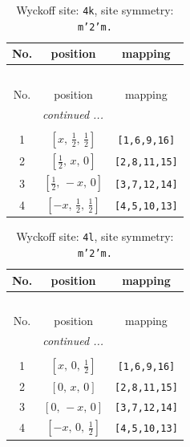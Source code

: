 \documentclass[fleqn,8pt]{jsarticle}
\begin{document}
\renewcommand{\arraystretch}{1.2}
\begin{longtable}{ccc}
\caption{Wyckoff site: {\tt 4k}, site symmetry: {\tt m'2'm.}}
 \\
 \hline \hline
No. & position & mapping \\ \hline \endfirsthead

\multicolumn{2}{l}{\tablename\ \thetable{}} \\
 \hline \hline
No. & position & mapping \\ \hline \endhead

 \hline \hline
\multicolumn{2}{r}{\footnotesize\it continued ...} \\ \endfoot

 \hline \hline
\multicolumn{2}{r}{} \\ \endlastfoot

1 & $\left[ x,\, \frac{1}{2},\, \frac{1}{2} \right]$ & {\tt [1,6,9,16]} \\ \hline
2 & $\left[ \frac{1}{2},\, x,\, 0 \right]$ & {\tt [2,8,11,15]} \\ \hline
3 & $\left[ \frac{1}{2},\, - x,\, 0 \right]$ & {\tt [3,7,12,14]} \\ \hline
4 & $\left[ - x,\, \frac{1}{2},\, \frac{1}{2} \right]$ & {\tt [4,5,10,13]} \\
\end{longtable}
\renewcommand{\arraystretch}{1.2}
\begin{longtable}{ccc}
\caption{Wyckoff site: {\tt 4l}, site symmetry: {\tt m'2'm.}}
 \\
 \hline \hline
No. & position & mapping \\ \hline \endfirsthead

\multicolumn{2}{l}{\tablename\ \thetable{}} \\
 \hline \hline
No. & position & mapping \\ \hline \endhead

 \hline \hline
\multicolumn{2}{r}{\footnotesize\it continued ...} \\ \endfoot

 \hline \hline
\multicolumn{2}{r}{} \\ \endlastfoot

1 & $\left[ x,\, 0,\, \frac{1}{2} \right]$ & {\tt [1,6,9,16]} \\ \hline
2 & $\left[ 0,\, x,\, 0 \right]$ & {\tt [2,8,11,15]} \\ \hline
3 & $\left[ 0,\, - x,\, 0 \right]$ & {\tt [3,7,12,14]} \\ \hline
4 & $\left[ - x,\, 0,\, \frac{1}{2} \right]$ & {\tt [4,5,10,13]} \\
\end{longtable}
\end{document}
